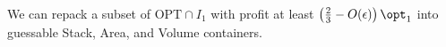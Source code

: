 

\begin{theorem}
\label{thm:guessableconfig}
    We can repack a subset of $\text{OPT}\cap I_1$ with profit at least $\left(\frac{2}{3}-O(\epsilon)\right)\opt_1$ into  guessable Stack, Area, and Volume containers. 
\end{theorem}

